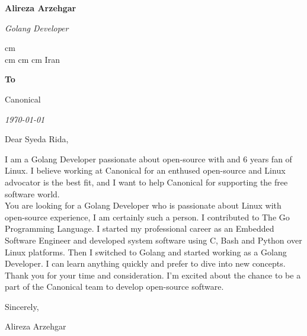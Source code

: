 \documentclass{coverletter}
\begin{document}
\textbf{\fontsize{24 pt}{24 pt}\selectfont Alireza Arzehgar}

\textit{Golang Developer}

\noindent\makebox[\linewidth]{\rule{\paperwidth}{0.1pt}}
\begin{center}
  \normalsize
  \mbox{}
   cm
  \mbox{}
  \\
   cm
  \mbox{}
   cm
  \mbox{}
   cm
  \mbox{{\color{black}\footnotesize\faMapMarker*}\hspace*{0.13cm}Iran}

  \noindent\makebox[\linewidth]{\rule{\paperwidth}{0.1pt}}
\end{center}

\vspace{2 cm}

\textbf{To}

Canonical

\textit{\today}

\vspace{1cm}
Dear Syeda Rida,
\vspace{0.6 cm}
\setlength{\parindent}{20pt}

I am a Golang Developer passionate about open-source with and 6 years fan of Linux. I believe working
at Canonical for an enthused open-source and Linux advocator is the best fit, and I want to help Canonical
for supporting the free software world.
\\

You are looking for a Golang Developer who is passionate about Linux with open-source experience,
I am certainly such a person.
I contributed to The Go Programming Language. I started my professional career as an
Embedded Software Engineer and developed system software using C, Bash and Python over Linux platforms.
Then I switched to Golang and started working as a Golang Developer.
I can learn anything quickly and prefer to dive into new concepts.
\\

Thank you for your time and consideration. I'm excited about the chance to be a part of the Canonical team to
develop open-source software. 
\\

\vspace{0.6 cm}
\setlength{\parindent}{0pt}

Sincerely,

Alireza Arzehgar
\end{document}
